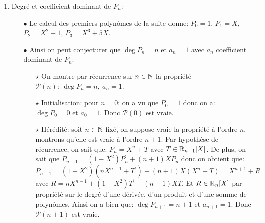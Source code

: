 \documentclass[a4paper, 11pt,reqno]{article}
\begin{document}
\begin{correction}
\begin{enumerate}
\begin{itemize}
\begin{itemize}
$$\begin{array}{lll}
						                  f^{(n+1)}(x) & = & \ddp\frac{ P_n^{\prime}(\sin{x})\cos{x}\times\cos^{n+1}{x}-(n+1)P_n(\sin{x})\cos^n{(x)}(-\sin{x})       }{ \cos^{2n+2}{x} }\vsec \\
						                               & = & \ddp\frac{\cos^n{x}\left( P_n^{\prime}(\sin{x})\cos^2{(x)}+(n+1)P_n(\sin{x})\sin{x}         \right)}{\cos^{2n+2}{(x)}}\vsec      \\
						                               & = & \ddp\frac{   P_n^{\prime}(\sin{x})(1-\sin^2{x})+(n+1)P_n(\sin{x})\sin{x}     }{\cos^{n+2}{x}}.
					                  \end{array}$$
				                  Ainsi, si on pose
				                  $$P_{n+1}=(1-X^2)P_n^{\prime}+(n+1)XP_n,$$
				                  $P_{n+1}$ est bien un polyn\^ome comme somme de polyn\^omes.
				            \item[$\star$] Cette fonction $f^{(n+1)}$ est bien continue sur $I$ et donc $f$ est bien de classe $C^{n+1}$ sur $I$.
			            \end{itemize}
			            Ainsi $\mathcal{P}(n+1)$ est vraie.
			      \item[$\bullet$] Conclusion: il r\'esulte du principe de r\'ecurrence que pour tout $n\in\N$, il existe un polyn\^ome $P_n$ tel que
			            $$\forall x\in I,\quad f^{(n)}(x)=\ddp\frac{P_n(x)}{(\cos{x})^{n+1}}.$$
		      \end{itemize}
		\item Degr\'e et coefficient dominant de $P_n$:
		      \begin{itemize}
			      \item[$\bullet$] Le calcul des premiers polyn\^{o}mes de la suite donne: $P_0=1$, $P_1=X$, $P_2=X^2+1$, $P_3=X^3+5X$.
			      \item[$\bullet$] Ainsi on peut conjecturer que $\deg{P_n}=n$ et $a_n=1$ avec $a_n$ coefficient dominant de $P_n$.
			            \begin{itemize}
				            \item[$\star$] On montre par r\'ecurrence sur $n\in\N$ la propri\'et\'e $\mathcal{P}(n):\ \deg{P_n}=n,\ a_n=1$.
				            \item[$\star$] Initialisation: pour $n=0$: on a vu que $P_0=1$ donc on a: $\deg{P_0}=0$ et $a_0=1$. Donc $\mathcal{P}(0)$ est vraie.
				            \item[$\star$] H\'er\'edit\'e: soit $n\in\N$ fix\'e, on suppose vraie la propri\'et\'e \`{a} l'ordre $n$, montrons qu'elle est vraie \`{a} l'ordre $n+1$. Par hypoth\`{e}se de r\'ecurrence, on sait que: $P_n=X^n+T$ avec $T\in\mathbb{R}_{n-1}\lbrack X\rbrack$. De plus, on sait que $P_{n+1}=(1-X^2)P_n^{\prime}+(n+1)XP_n$ donc on obtient que: $P_{n+1}=(1+X^2)(nX^{n-1}+T^{\prime})+(n+1)X ( X^{n}+T)=X^{n+1}+R$ avec $R=n X^{n-1}+(1-X^2)T^{\prime}+(n+1)XT$. Et $R\in \mathbb{R}_{n}\lbrack X\rbrack$ par propri\'et\'e sur le degr\'e d'une d\'eriv\'ee, d'un produit et d'une somme de polyn\^{o}mes. Ainsi on a bien que: $\deg{P_{n+1}}=n+1$ et $a_{n+1}=1$. Donc $\mathcal{P}(n+1)$ est vraie.

\end{itemize}
\end{itemize}
\end{enumerate}
\end{correction}
\end{document}
